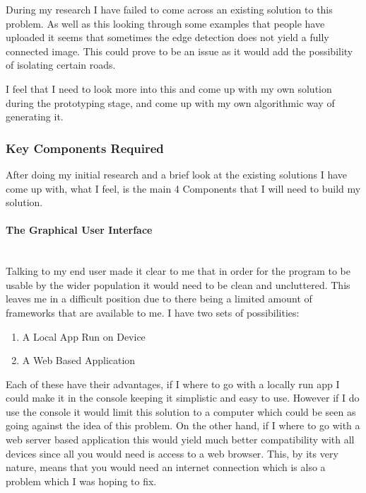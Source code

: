 \begin{FlushLeft}
            During my research I have failed to come across an existing solution to this problem. As well as this looking through some examples that people have uploaded it seems that sometimes the edge 
            detection does not yield a fully connected image. This could prove to be an issue as it would add the possibility of isolating certain roads. \\ \bk
            
            I feel that I need to look more into this and come up with my own solution during the prototyping stage, and come up with my own algorithmic way of generating it. \\ \bk
            
            \bk

            \subsubsection{Key Components Required}
            After doing my initial research and a brief look at the existing solutions I have come up with, what I feel, is the main 4 Components that I will need to build my solution. \\ \bk
            
            \paragraph{The Graphical User Interface} \mbox{} \\
            Talking to my end user made it clear to me that in order for the program to be usable by the wider population it would need to be clean and uncluttered. This leaves me in a difficult position 
            due to there being a limited amount of frameworks that are available to me. I have two sets of possibilities: \\
            \begin{enumerate}
                \item A Local App Run on Device
                \item A Web Based Application
            \end{enumerate}
            Each of these have their advantages, if I where to go with a locally run app I could make it in the console keeping it simplistic and easy to use. However if I do use the console it would limit
             this solution to a computer which could be seen as going against the idea of this problem. On the other hand, if I where to go with a web server based application this would yield much better 
             compatibility with all devices since all you would need is access to a web browser. This, by its very nature, means that you would need an internet connection which is also a problem which I
              was hoping to fix. \\ \bk
            

\end{FlushLeft}
